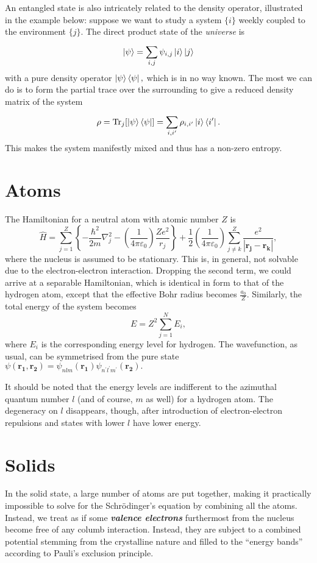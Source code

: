 \documentclass{article}
\theoremstyle{nonumberplain}
\begin{document}
An entangled state is also intricately related to the density operator, illustrated in the example below: suppose we want to study a system $\{i\}$ weekly coupled to the environment $\{j\}$. The direct product state of the \textit{universe} is 
\[
    \ket{\psi} = \sum_{i,j}^{} \psi_{i,j} \ket{i} \ket{j}
\]
with a pure density operator $\ket{\psi}\bra{\psi},$ which is in no way known. The most we can do is to form the partial trace over the surrounding to give a reduced density matrix of the system 
\[
    \rho = \mathrm{Tr}_{j} [\ket{\psi}\bra{\psi}] = \sum_{i,i^\prime }^{} \rho_{i,i^\prime} \ket{i} \bra{i^\prime }. 
\]
This makes the system manifestly mixed and thus has a non-zero entropy. 
\section{Atoms}
The Hamiltonian for a neutral atom with atomic number $Z$ is 
\[
    \hat{H} = 
    \sum\limits_{j=1}^{Z} \left\{ -\frac{\hbar ^{2}}{2m} \nabla ^{2} _j -\left( \frac{1}{4 \pi \varepsilon_0}   \right) \frac{Ze^{2} }{r_j}\right\} + 
    \frac{1}{2} \left( \frac{1}{4 \pi  \varepsilon_0}\right) \sum\limits_{j\neq k}^{Z} \frac{e^{2} }{\left\vert \mathbf{r_j} - \mathbf{r_k}  \right\vert },
\]
where the nucleus is assumed to be stationary. This is, in general, not solvable due to the electron-electron interaction. Dropping the second term, we could arrive at a separable Hamiltonian, which is identical in form to that of the hydrogen atom, except that the effective Bohr radius becomes $\frac{a_0}{Z}$. Similarly, the total energy of the system becomes 
\[
    E = Z^{2} \sum\limits_{j=1}^{N} E_i, 
\]
where $E_i$ is the corresponding energy level for hydrogen. The wavefunction, as usual, can be symmetrised from the pure state 
\(
    \psi(\mathbf{r_1}, \mathbf{r_2}  ) = \psi_{nlm} (\mathbf{r_1} ) \psi_{n^\prime l^\prime m^\prime } (\mathbf{r_2} ).
\) 

It should be noted that the energy levels are indifferent to the azimuthal quantum number $l$ (and of course, $m$ as well) for a hydrogen atom. The degeneracy on $l$ disappears, though, after introduction of electron-electron repulsions and states with lower $l$ have lower energy. 
\section{Solids}
In the solid state, a large number of atoms are put together, making it practically impossible to solve for the Schrödinger's equation by combining all the atoms. Instead, we treat as if some \textit{\textbf{valence electrons}} furthermost from the nucleus become free of any columb interaction. Instead, they are subject to a combined potential stemming from the crystalline nature and filled to the ``energy bands'' according to Pauli's exclusion principle.
\end{document}
